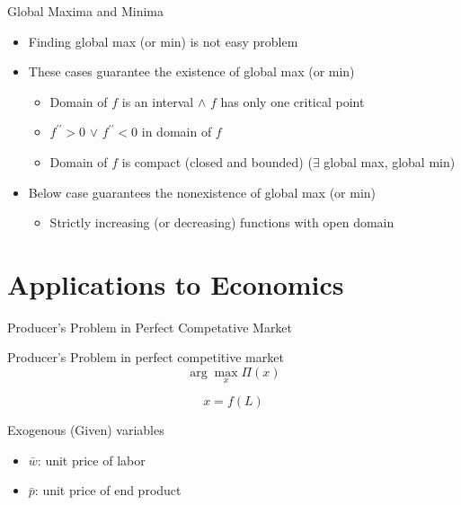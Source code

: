 \documentclass[a4paper,11pt]{article}
\begin{document}
\begin{frame}[t]{Global Maxima and Minima}
	\begin{itemize}
		\item Finding global max (or min) is not easy problem
		\item These cases guarantee the existence of global max (or min)
		\begin{itemize}
			\item Domain of $f$ is an interval $\land$ $f$ has only one critical point
			\item $f^{\prime\prime}>0$ $\lor$ $f^{\prime\prime}<0$ in domain of $f$
			\item Domain of $f$ is compact (closed and bounded)    ($\exists$ global max, global min)
		\end{itemize}
		\item Below case guarantees the nonexistence of global max (or min)
		\begin{itemize}
			\item Strictly increasing (or decreasing) functions with open domain
		\end{itemize}
	\end{itemize}
\end{frame}

\section{Applications to Economics} %
\label{sec:applications_to_economics}
\begin{frame}[t]{Producer's Problem in Perfect Competative Market}
	
	\begin{block}
		{Producer's Problem in perfect competitive market}
		\[
			\arg\max_x \Pi(x)
		\]
	\end{block}
	\[
		x=f(L) \tag{Production Function}
	\]
	\begin{block}
		{Exogenous (Given) variables}
		\begin{itemize}
			\item $\bar w$: unit price of labor
			\item $\bar p$: unit price of end product
		\end{itemize}
	\end{block}
\end{frame}
\end{document}
